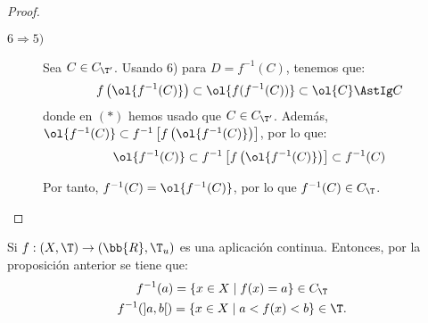\begin{proof}
\begin{description}
        \item[$6\Longrightarrow 5)$] Sea $C\in C_{\T'}$. Usando 6) para $D=f^{-1}(C)$, tenemos que: $$f\left(\ol{f^{-1}(C)}\right)\subset \ol{f(f^{-1}(C))}\subset \ol{C}\AstIg C$$
        donde en $(\ast)$ hemos usado que $C\in C_{\T'}$. Además, $\ol{f^{-1}(C)}\subset f^{-1}\left[f\left(\ol{f^{-1}(C)}\right)\right]$, por lo que:
        \begin{equation*}
            \ol{f^{-1}(C)}\subset f^{-1}\left[f\left(\ol{f^{-1}(C)}\right)\right] \subset f^{-1}(C)
        \end{equation*}
        

        Por tanto, $f^{-1}(C)=\ol{f^{-1}(C)}$, por lo que $f^{-1}(C)\in C_\T$.
        
    \end{description}
\end{proof}


\begin{observacion}
    Si $f:(X,\T)\to (\bb{R},\T_u)$ es una aplicación continua. Entonces, por la proposición anterior se tiene que:
    \begin{gather*}
        f^{-1}(a)=\{x\in X\mid f(x)=a\}\in C_\T\\
        f^{-1}(]a,b[)=\{x\in X\mid a<f(x)<b\}\in \T.
    \end{gather*}
\end{observacion}


